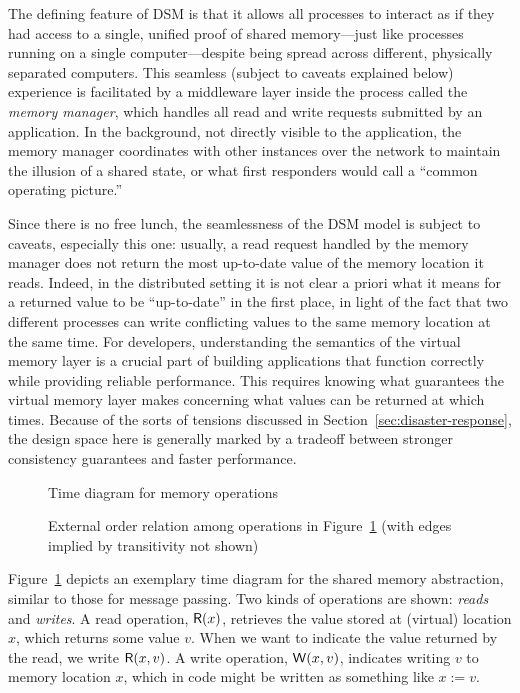 \documentclass[]             %
{NASA}                       %
\theoremstyle{definition}
\begin{document}
The defining feature of DSM is that it allows all processes to
interact as if they had access to a single, unified proof of shared
memory---just like processes running on a single computer---despite
being spread across different, physically separated computers.  This
seamless (subject to caveats explained below) experience is
facilitated by a middleware layer inside the process called the
\emph{memory manager}, which handles all read and write requests
submitted by an application. In the background, not directly visible
to the application, the memory manager coordinates with other
instances over the network to maintain the illusion of a shared state,
or what first responders would call a ``common operating picture.''

Since there is no free lunch, the seamlessness of the DSM model is
subject to caveats, especially this one: usually, a read request
handled by the memory manager does not return the most up-to-date
value of the memory location it reads. Indeed, in the distributed
setting it is not clear a priori what it means for a returned value to
be ``up-to-date'' in the first place, in light of the fact that two
different processes can write conflicting values to the same memory
location at the same time. For developers, understanding the semantics
of the virtual memory layer is a crucial
part of building applications that function correctly while providing
reliable performance. This requires  knowing what guarantees the
virtual memory layer  makes concerning what values can be returned at which times.
 Because of the sorts of tensions discussed in
Section~\ref{sec:disaster-response}, the design space here is
generally marked by a tradeoff between stronger consistency guarantees
and faster performance.

\begin{figure}
    \centering
    
    \caption{Time diagram for memory operations}
    \label{fig:dsm-example-1}
\end{figure}

\begin{figure}
  \centering
  
  \caption{External order relation among operations in Figure~\ref{fig:dsm-example-1} (with edges implied by transitivity not shown)}
  \label{fig:dsm-example-1-DAG}
\end{figure}

Figure~\ref{fig:dsm-example-1} depicts an exemplary time diagram for
the shared memory abstraction, similar to those for message
passing. Two kinds of operations are shown: \emph{reads} and
\emph{writes}. A read operation, $\mathsf{R}\!\left(x\right)$, retrieves the value
stored at (virtual) location $x$, which returns some value $v$. When
we want to indicate the value returned by the read, we write
$\mathsf{R}\!\left(x, v\right)$. A write operation, $\mathsf{W}\!\left(x, v\right)$, indicates
writing $v$ to memory location $x$, which in code might be written as
something like $x := v$.
\end{document}
